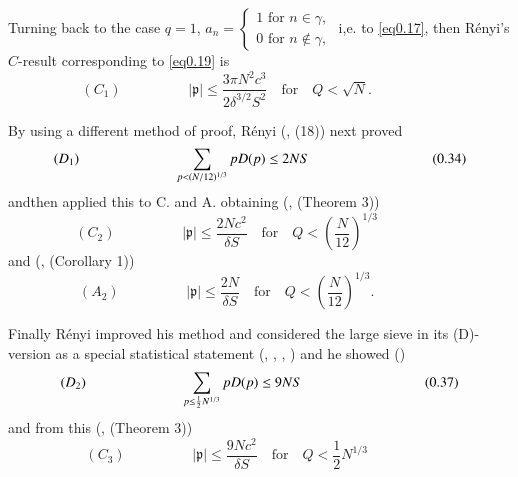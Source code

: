 Turning back to the case $q =1$,  $a_n = 
\begin{cases} 
1 \text{ for } n \in \gamma, \\
 0  \text{ for } n \notin \gamma , 
\end{cases}$
i,e. to \eqref{eq0.17}, then
R\'enyi's $C$-result corresponding to \eqref{eq0.19} is 
\begin{equation*}
(C_{1}) \hspace{2cm} |\mathfrak{p}| \leq \frac{3 \pi N^2
c^3}{2 \delta^{3/2}S^2}  \quad \text{for}\quad Q
< \sqrt{N}. \hspace{2cm} \tag{0.33}\label{eq0.33}   
\end{equation*}

By using a different method of proof, R\'enyi (\cite{key7}, (18)) next proved 
\begin{equation*}
(D_1)  \hspace{2.4cm}\sum_{p< (N/12)^{1/3}} p D (p) \leq 2
NS \hspace{2.4cm} \tag{0.34}\label{eq0.34}  
\end{equation*}
and\pageoriginale then applied this to C. and A. obtaining
(\cite{key7}, (Theorem 3)) 
\begin{equation*}
(C_2) \hspace{2cm} |\mathfrak{p}|\leq \frac {2 N c^2}{\delta S} \quad 
  \text{for} \quad Q < (\frac{N}{12})^{1/3} \hspace{2cm} \tag{0.35}\label{eq0.35} 
\end{equation*}
and (\cite{key7}, (Corollary 1))
\begin{equation*}
(A_2) \hspace{2cm} |\mathfrak{p}| \leq \frac{2N}{\delta S} \quad
  \text{for}\quad Q <
  (\frac{N}{12})^{1/3}. \hspace{2cm} \tag{0.36}\label{eq0.36}   
\end{equation*}

Finally R\'enyi improved his method and considered the large sieve in
its (D)-version as a special statistical statement
(\cite{key4}, \cite{key8}, \cite{key10}, \cite{key12}) and he showed
(\cite{key4})  
\begin{equation*}
(D_2) \hspace{2.4cm} \sum _{p \leq \frac{1}{2} N^{1/3}} p D (p) \leq 9
  NS \hspace{2.4cm} \tag{0.37}\label{eq0.37}  
\end{equation*}
and from this (\cite{key4}, (Theorem 3))
\begin{equation*}
(C_{3}) \hspace{2cm} |\mathfrak{p}| \leq \frac{9 N c^2}{\delta S}
  \quad\text{for}\quad Q
  < \frac{1}{2}N^{1/3} \hspace{2cm} \tag{0.38}\label{eq0.38}   
\end{equation*}

